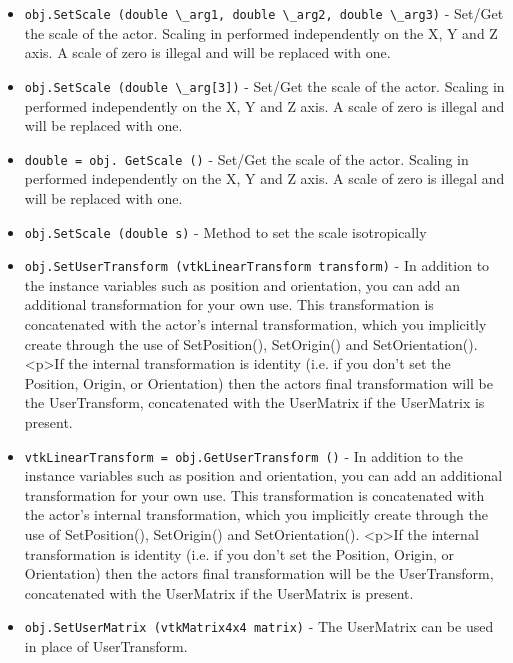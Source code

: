 \begin{itemize}
\item  \verb|obj.SetScale (double \_arg1, double \_arg2, double \_arg3)| -  Set/Get the scale of the actor. Scaling in performed independently on the
 X, Y and Z axis. A scale of zero is illegal and will be replaced with one.

\item  \verb|obj.SetScale (double \_arg[3])| -  Set/Get the scale of the actor. Scaling in performed independently on the
 X, Y and Z axis. A scale of zero is illegal and will be replaced with one.

\item  \verb|double = obj. GetScale ()| -  Set/Get the scale of the actor. Scaling in performed independently on the
 X, Y and Z axis. A scale of zero is illegal and will be replaced with one.

\item  \verb|obj.SetScale (double s)| -  Method to set the scale isotropically

\item  \verb|obj.SetUserTransform (vtkLinearTransform transform)| -  In addition to the instance variables such as position and orientation,
 you can add an additional transformation for your own use.  This
 transformation is concatenated with the actor's internal transformation,
 which you implicitly create through the use of SetPosition(),
 SetOrigin() and SetOrientation().
 <p>If the internal transformation
 is identity (i.e. if you don't set the Position, Origin, or
 Orientation) then the actors final transformation will be the
 UserTransform, concatenated with the UserMatrix if the UserMatrix
 is present.

\item  \verb|vtkLinearTransform = obj.GetUserTransform ()| -  In addition to the instance variables such as position and orientation,
 you can add an additional transformation for your own use.  This
 transformation is concatenated with the actor's internal transformation,
 which you implicitly create through the use of SetPosition(),
 SetOrigin() and SetOrientation().
 <p>If the internal transformation
 is identity (i.e. if you don't set the Position, Origin, or
 Orientation) then the actors final transformation will be the
 UserTransform, concatenated with the UserMatrix if the UserMatrix
 is present.

\item  \verb|obj.SetUserMatrix (vtkMatrix4x4 matrix)| -  The UserMatrix can be used in place of UserTransform.


\end{itemize}
